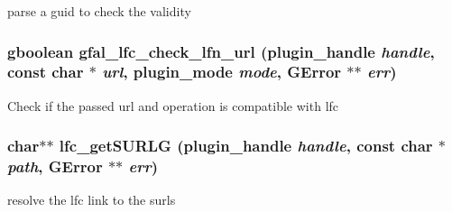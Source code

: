parse a guid to check the validity 
\subsubsection{\setlength{\rightskip}{0pt plus 5cm}gboolean gfal\_\-lfc\_\-check\_\-lfn\_\-url (plugin\_\-handle {\em handle}, const char $\ast$ {\em url}, plugin\_\-mode {\em mode}, GError $\ast$$\ast$ {\em err})}\label{gfal__common__lfc_8h_88b02b9ae89630e0516554a409ed82e9}


Check if the passed url and operation is compatible with lfc 
\subsubsection{\setlength{\rightskip}{0pt plus 5cm}char$\ast$$\ast$ lfc\_\-get\-SURLG (plugin\_\-handle {\em handle}, const char $\ast$ {\em path}, GError $\ast$$\ast$ {\em err})}\label{gfal__common__lfc_8h_ab2b9f80b14228974befa9d005ea7bc9}


resolve the lfc link to the surls 